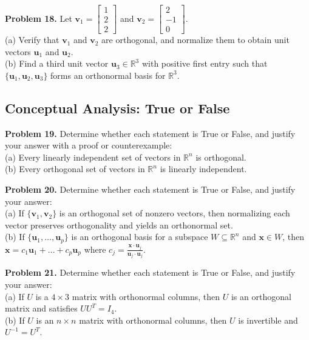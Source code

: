 \documentclass[11pt, letterpaper]{article}
\theoremstyle{definition}
\theoremstyle{remark}
\begin{document}
\textbf{Problem 18.} Let $\mathbf{v}_1 = \begin{bmatrix} 1 \\ 2 \\ 2 \end{bmatrix}$ and $\mathbf{v}_2 = \begin{bmatrix} 2 \\ -1 \\ 0 \end{bmatrix}$. \\
(a) Verify that $\mathbf{v}_1$ and $\mathbf{v}_2$ are orthogonal, and normalize them to obtain unit vectors $\mathbf{u}_1$ and $\mathbf{u}_2$. \\
(b) Find a third unit vector $\mathbf{u}_3 \in \mathbb{R}^3$ with positive first entry such that $\{\mathbf{u}_1, \mathbf{u}_2, \mathbf{u}_3\}$ forms an orthonormal basis for $\mathbb{R}^3$.

\subsection{Conceptual Analysis: True or False}

\textbf{Problem 19.} Determine whether each statement is True or False, and justify your answer with a proof or counterexample: \\
(a) Every linearly independent set of vectors in $\mathbb{R}^n$ is orthogonal. \\
(b) Every orthogonal set of vectors in $\mathbb{R}^n$ is linearly independent.

\textbf{Problem 20.} Determine whether each statement is True or False, and justify your answer: \\
(a) If $\{\mathbf{v}_1, \mathbf{v}_2\}$ is an orthogonal set of nonzero vectors, then normalizing each vector preserves orthogonality and yields an orthonormal set. \\
(b) If $\{\mathbf{u}_1, \dots, \mathbf{u}_p\}$ is an orthogonal basis for a subspace $W \subseteq \mathbb{R}^n$ and $\mathbf{x} \in W$, then $\mathbf{x} = c_1\mathbf{u}_1 + \dots + c_p\mathbf{u}_p$ where $c_j = \frac{\mathbf{x} \cdot \mathbf{u}_j}{\mathbf{u}_j \cdot \mathbf{u}_j}$.

\textbf{Problem 21.} Determine whether each statement is True or False, and justify your answer: \\
(a) If $U$ is a $4 \times 3$ matrix with orthonormal columns, then $U$ is an orthogonal matrix and satisfies $U U^T = I_4$. \\
(b) If $U$ is an $n \times n$ matrix with orthonormal columns, then $U$ is invertible and $U^{-1} = U^T$.
\end{document}
